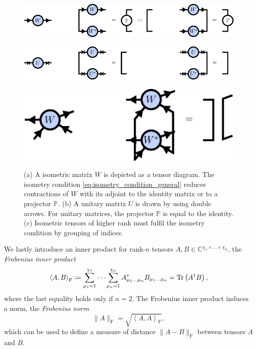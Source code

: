 \begin{figure}[ht]
	\centering
	\subcaptionbox{\label{fig:basic_isometries_isometric_matrix}}
	{%
		\includegraphics[scale=1]{figures/tikz/Tensor_Networks/basic_isometries/basic_isometries_a.pdf}
	}
	\par\bigskip
	\subcaptionbox{\label{fig:basic_isometries_unitary_matrix}}
	{%
	\includegraphics[scale=1]{figures/tikz/Tensor_Networks/basic_isometries/basic_isometries_c.pdf}
	}
	\par\bigskip
	\subcaptionbox{\label{fig:basic_isometries_isometric_tensor}}
	{%
		\includegraphics[scale=1]{figures/tikz/Tensor_Networks/basic_isometries/basic_isometries_b.pdf}
	}
	\caption{(a) A isometric matrix $W$ is depicted as a tensor diagram. The isometry condition \eqref{eq:isometry_condition_general} reduces contractions of $W$ with its adjoint to the identity matrix or to a projector $\mathbb{P}$. (b) A unitary matrix $U$ is drawn by using double arrows. For unitary matrices, the projector $\mathbb{P}$ is equal to the identity. (c) Isometric tensors of higher rank must fulfil the isometry condition by grouping of indices.}
	\label{fig:isometries_and_unitaries_diagrams}
\end{figure}
We lastly introduce an inner product for rank-$n$ tensors $A, B \in \mathbb{C}^{\chi_1\times\dots\times\chi_n}$, the \textit{Frobenius inner product}
\begin{equation}
	\label{eq:frobenius_inner_product}
	\left\langle A, B\right\rangle_\text{F} \coloneqq \sum_{\mu_1=1}^{\chi_1} \dots \sum_{\mu_n=1}^{\chi_n} A_{\mu_1\dots\mu_n}^*B_{\mu_1\dots\mu_n} = \operatorname{Tr}\left(A^\dagger B\right),
\end{equation}
where the last equality holds only if $n = 2$. The Frobenius inner product induces a norm, the \textit{Frobenius norm}
\begin{equation}
	\label{eq:frobenius_norm}
	\lVert A\rVert_\text{F} = \sqrt{\left\langle A, A\right\rangle_\text{F}},
\end{equation}
which can be used to define a measure of distance $\lVert A-B\rVert_\text{F}$ between tensors $A$ and $B$.